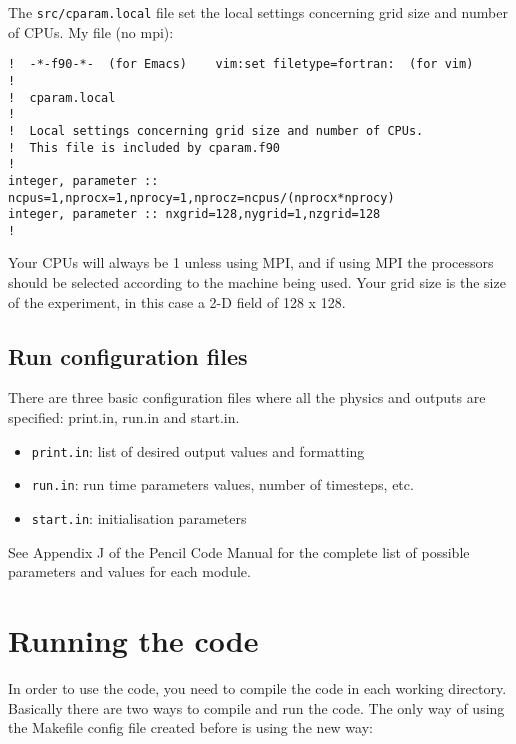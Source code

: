 \documentclass[a4paper,12pt]{article}
\begin{document}

The \texttt{src/cparam.local} file set the local settings concerning grid size
and number of CPUs. My file (no mpi):
\begin{verbatim}
!  -*-f90-*-  (for Emacs)    vim:set filetype=fortran:  (for vim)
!
!  cparam.local
!
!  Local settings concerning grid size and number of CPUs.
!  This file is included by cparam.f90
!
integer, parameter :: ncpus=1,nprocx=1,nprocy=1,nprocz=ncpus/(nprocx*nprocy)
integer, parameter :: nxgrid=128,nygrid=1,nzgrid=128
!
\end{verbatim}

Your CPUs will always be 1 unless using MPI, and if using MPI the processors should be selected according to the machine being used. Your grid size is the size of the experiment, in this case a 2-D field of 128 x 128.

\subsection{Run configuration files}

There are three basic configuration files where all the physics and outputs are specified: print.in, run.in and start.in.
\begin{itemize}
 \item \verb|print.in|: list of desired output values and formatting
 \item \verb|run.in|: run time parameters values, number of timesteps, etc.
 \item \verb|start.in|: initialisation parameters
\end{itemize}

See Appendix J of the Pencil Code Manual for the complete list of possible parameters and values for each module. 



\section{Running the code}

In order to use the code, you need to compile the code in each working directory. Basically there are two ways to compile and run the code. The only way of using the Makefile config file created before is using the new way:
\end{document}
